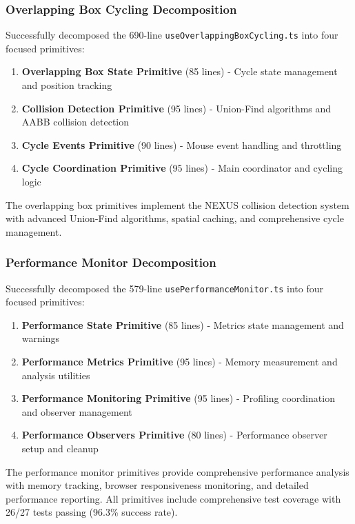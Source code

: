 \documentclass[11pt]{article}
\begin{document}
\subsubsection{Overlapping Box Cycling Decomposition}

Successfully decomposed the 690-line \texttt{useOverlappingBoxCycling.ts} into four focused primitives:

\begin{enumerate}
\item \textbf{Overlapping Box State Primitive} (85 lines) - Cycle state management and position tracking
\item \textbf{Collision Detection Primitive} (95 lines) - Union-Find algorithms and AABB collision detection
\item \textbf{Cycle Events Primitive} (90 lines) - Mouse event handling and throttling
\item \textbf{Cycle Coordination Primitive} (95 lines) - Main coordinator and cycling logic
\end{enumerate}

The overlapping box primitives implement the NEXUS collision detection system with advanced Union-Find algorithms, spatial caching, and comprehensive cycle management.

\subsubsection{Performance Monitor Decomposition}

Successfully decomposed the 579-line \texttt{usePerformanceMonitor.ts} into four focused primitives:

\begin{enumerate}
\item \textbf{Performance State Primitive} (85 lines) - Metrics state management and warnings
\item \textbf{Performance Metrics Primitive} (95 lines) - Memory measurement and analysis utilities
\item \textbf{Performance Monitoring Primitive} (95 lines) - Profiling coordination and observer management
\item \textbf{Performance Observers Primitive} (80 lines) - Performance observer setup and cleanup
\end{enumerate}

The performance monitor primitives provide comprehensive performance analysis with memory tracking, browser responsiveness monitoring, and detailed performance reporting. All primitives include comprehensive test coverage with 26/27 tests passing (96.3\% success rate).
\end{document}
